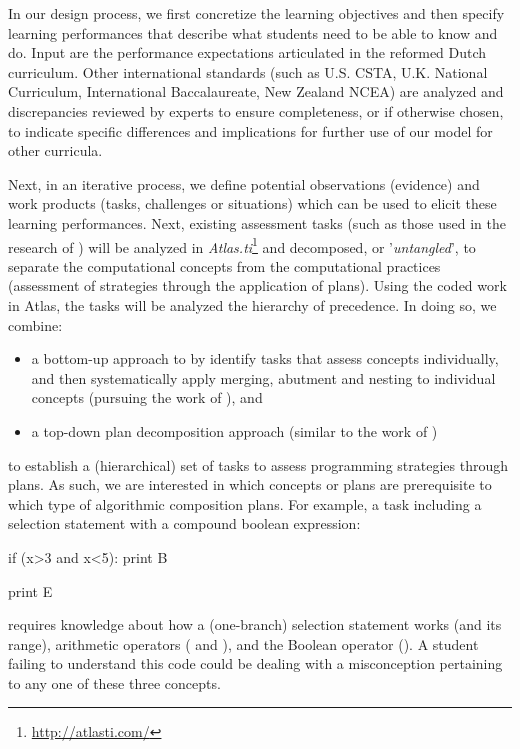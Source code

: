 In our design process, we first concretize the learning objectives and then specify learning performances that describe what students need to be able to know and do. Input are the performance expectations articulated in the reformed Dutch curriculum. Other international standards (such as U.S. CSTA, U.K. National Curriculum, International Baccalaureate, New Zealand NCEA) are analyzed and discrepancies reviewed by experts to ensure completeness, or if otherwise chosen, to indicate specific differences and implications for further use of our model for other curricula.

Next, in an iterative process, we define potential observations (evidence) and work products (tasks, challenges or situations) which can be used to elicit these learning performances. Next, existing assessment tasks (such as those used in the research of \citeauthor{LuxtonReilly2018}) will be analyzed in \emph{Atlas.ti}\footnote{\url{http://atlasti.com/}} and decomposed, or '\emph{untangled}', to separate the computational concepts from the computational practices (assessment of strategies through the application of plans). Using the coded work in Atlas, the tasks will be analyzed the hierarchy of precedence. In doing so, we combine:
\begin{itemize}
\item a bottom-up approach to by identify tasks that assess concepts individually, and then systematically apply merging, abutment and nesting to individual concepts (pursuing the work of \citeauthor{deRaadt2009teachingPlans}), and
\item a top-down plan decomposition approach (similar to the work of \citeauthor{LuxtonReilly2018})
\end{itemize}
to establish a (hierarchical) set of tasks to assess programming strategies through plans. As such, we are interested in which concepts or plans are prerequisite to which type of algorithmic composition plans. For example, a task including a selection statement with a compound boolean expression:
%
\begin{PYTHON}
if (x>3 and x<5):
    print B

print E
\end{PYTHON}
%
requires knowledge about how a (one-branch) selection statement works (and its range), arithmetic operators (\jav{<} and \jav{>}), and the Boolean operator (). A student failing to understand this code could be dealing with a misconception pertaining to any one of these three concepts.

